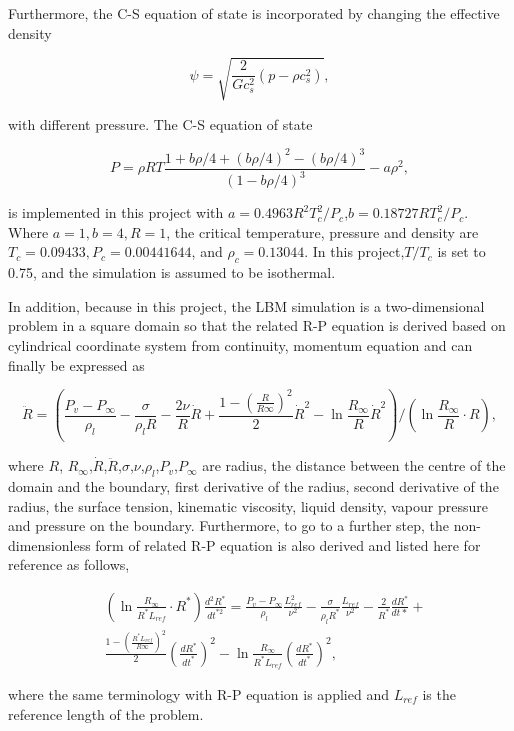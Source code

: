 \documentclass[review]{elsarticle}
\begin{document}
Furthermore, the C-S equation of state is incorporated by changing the effective density \cite{shi2020numerical}
\begin{linenomath*}
\begin{equation}
	\psi=\sqrt{\frac{2}{G c_s^2}\left(p-\rho c_s^2\right)},
\end{equation}
\end{linenomath*}
with different pressure. The C-S equation of state \cite{peng2019simulation}
\begin{linenomath*}
\begin{equation}
	P=\rho R T \frac{1+b \rho / 4+(b \rho / 4)^2-(b \rho / 4)^3}{(1-b \rho / 4)^3}-a \rho^2,
\end{equation}
\end{linenomath*}
is implemented in this project with $a= 0.4963R^2T_c^2/P_c$,$b=0.18727RT_c^2/P_c$. Where $ a= 1, b= 4, R= 1$, the
critical temperature, pressure and density are $T_c = 0.09433, P_c=0.00441644$, and $\rho_c= 0.13044$. In this project,$T/T_c$ is set to 0.75, and the simulation is assumed to be isothermal.

In addition, because in this project, the LBM simulation is a two-dimensional problem in a square domain so that the related R-P equation is derived based on cylindrical coordinate system from continuity, momentum equation and can finally be expressed as
\begin{linenomath*}
\begin{equation}
	\ddot{R}=\left(\frac{P_v-P_{\infty}}{\rho_l}-\frac{\sigma}{\rho_l R} -\frac{2 \nu}{R} \dot{R}+\frac{1-\left(\frac{R}{R \infty}\right)^2}{2} \dot{R}^2-\ln \frac{R_{\infty}}{R} \dot{R}^2\right)/\left(\ln \frac{R_{\infty}}{R} \cdot R\right),
\label{equ:r-p}
\end{equation}
\end{linenomath*}
where $R$, $R_{\infty}$,$\dot{R}$,$\ddot{R}$,$\sigma$,$\nu$,$\rho_l$,$P_v$,$P_{\infty}$ are radius, the distance between the centre of the domain and the boundary, first derivative of the radius, second derivative of the radius, the surface tension, kinematic viscosity, liquid density, vapour pressure and pressure on the boundary. Furthermore, to go to a further step, the non-dimensionless form of related R-P equation is also derived and listed here for reference as follows,
\begin{linenomath*}
\begin{equation}
	\begin{aligned}
		& \left(\ln \frac{R_{\infty}}{R^* L_{r e f}} \cdot R^*\right) \frac{d^2 R^*}{d t^{* 2}}= 
		 \frac{P_v-P_{\infty}}{\rho_l} \frac{L_{r e f}^2}{\nu^2}-\frac{\sigma}{\rho_l R^*} \frac{L_{r e f}}{\nu^2}-\frac{2}{R^*} \frac{d R^*}{d t *}+\\
		 &\frac{1-\left(\frac{R^* L_{r e f}}{R \infty}\right)^2}{2}\left(\frac{d R^*}{d t^*}\right)^2-\ln \frac{R_{\infty}}{R^* L_{r e f}}\left(\frac{d R^*}{d t^*}\right)^2,
	\end{aligned}
\end{equation}
\end{linenomath*}
where the same terminology with R-P equation is applied and  $L_{ref}$ is the reference length of the problem.
\end{document}
